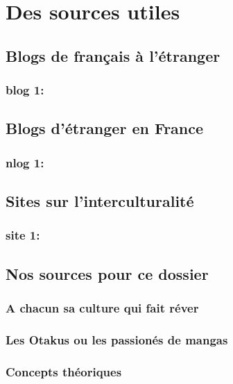 \part{Des sources utiles}

\chapter{Blogs de français à l'étranger}
\section{blog 1:}


\chapter{Blogs d'étranger en France}
\section{nlog 1:}

\chapter{Sites sur l'interculturalité}
\section{site 1:}


\chapter{Nos sources pour ce dossier}
\section{A chacun sa culture qui fait réver}
\section{Les Otakus ou les passionés de mangas}
\section{Concepts théoriques}